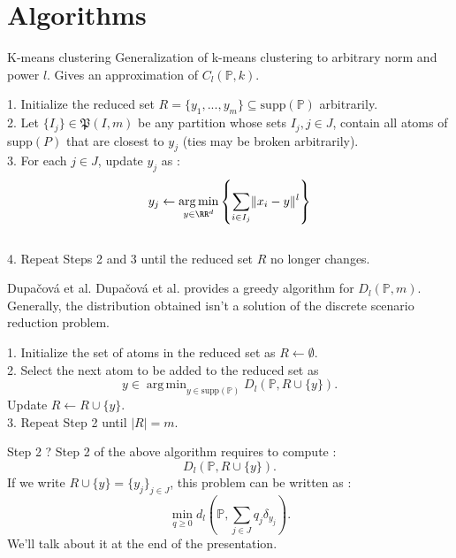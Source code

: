 \documentclass{beamer}
\DeclareMathOperator*{\argmin}{arg\,min}
\theoremstyle{plain}
\begin{document}
\section{Algorithms}
\begin{frame}{K-means clustering}
Generalization of k-means clustering to arbitrary norm and power $l$. Gives an approximation of $C_l\left(\mathbb{P},k\right).$
\begin{algorithm}[H]
    \caption{k-means clustering for $C_l\left(\mathbb{P},m\right)$}
    1. Initialize the reduced set $R=\{y_1,...,y_m\} \subseteq \text{supp}\left(\mathbb{P}\right)$ arbitrarily. \\ 2. Let $\{I_j\}\in\mathfrak{P}\left(I,m\right)$ be any partition whose sets $I_j, j\in J$, contain all atoms of supp$\left(P\right)$ that are closest to $y_j$ (ties may be broken arbitrarily). \\ 3. For each $j\in J$, update $y_j$ as : $$y_j \gets \argmin_{y\in\RR^d} \left\{ \sum_{i\in I_j}\lVert x_i-y\rVert^l\right\}$$ \\ 4. Repeat Steps 2 and 3 until the reduced set $R$ no longer changes.
\end{algorithm}
\end{frame}

\begin{frame}{Dupačová et al.}
Dupačová et al. \cite{dupacova_scenario_2003} provides a greedy algorithm for $D_l\left(\mathbb{P},m\right)$. Generally, the distribution obtained isn't a solution of the discrete scenario reduction problem.
\begin{algorithm}[H]
  \caption{Dupačová et al.}\label{dupacova}
  1. Initialize the set of atoms in the reduced set as $R\gets \emptyset.$ \\ 2. Select the next atom to be added to the reduced set as $$ y\in\argmin_{y\in \text{supp}\left(\mathbb{P}\right)}D_l\left(\mathbb{P},R\cup\{y\}\right).
  $$
  Update $R\gets R\cup \{y\}$.\\ 3. Repeat Step 2 until $\lvert R\rvert=m$.
\end{algorithm}
\end{frame}

\begin{frame}{Step 2 ?}
    Step 2 of the above algorithm requires to compute :
    $$
    D_l\left(\mathbb{P},R\cup\{y\}\right).
    $$
    If we write $R\cup\{y\}=\{y_j\}_{j\in J}$, this problem can be written as : 
    $$
    \min_{q\geq 0}d_l\left(\mathbb{P}, \sum_{j\in J}q_j\delta_{y_j}\right).
    $$
    We'll talk about it at the end of the presentation.
\end{frame}
\end{document}
